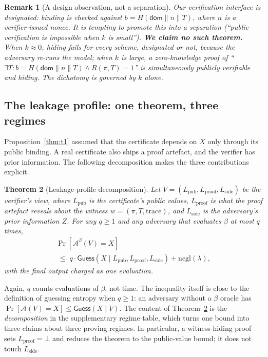 \documentclass[10pt,journal,compsoc]{IEEEtran}
\newtheorem{theorem}{Theorem}
\newtheorem{remark}[theorem]{Remark}
\begin{document}
\begin{remark}[A design observation, not a separation]
\label{rem:designated}
Our verification interface is \emph{designated}: binding is checked against
$b=H(\mathsf{dom}\|n\|T)$, where $n$ is a verifier-issued nonce. It is tempting
to promote this into a separation (``public verification is impossible when $k$
is small''). \textbf{We claim no such theorem.} When $k\approx 0$, hiding fails
for \emph{every} scheme, designated or not, because the adversary re-runs the
model; when $k$ is large, a zero-knowledge proof of
``$\exists T: b=H(\mathsf{dom}\|n\|T)\wedge R(\pi,T)=1$'' is simultaneously
publicly verifiable and hiding. The dichotomy is governed by $k$ alone.
\end{remark}

\subsection{The leakage profile: one theorem, three regimes}
\label{sec:leak}

Proposition~\ref{thm:t1} assumed that the certificate depends on $X$ only
through its public binding. A real certificate also ships a proof artefact, and
the verifier has prior information. The following decomposition makes the three
contributions explicit.

\begin{theorem}[Leakage-profile decomposition]
\label{thm:leak}
Let $V=(L_{\mathrm{pub}},L_{\mathrm{proof}},L_{\mathrm{side}})$ be the verifier's
view, where $L_{\mathrm{pub}}$ is the certificate's public values,
$L_{\mathrm{proof}}$ is what the proof artefact reveals about the witness
$w=(\pi,T,\mathrm{trace})$, and $L_{\mathrm{side}}$ is the adversary's prior
information $Z$. For any $q\ge 1$ and any adversary that evaluates $\beta$ at
most $q$ times,
\begin{multline*}
\Pr\!\left[\mathcal{A}^\beta(V)=X\right]\\
\;\le\; q\cdot\mathsf{Guess}\!\left(X\mid L_{\mathrm{pub}},L_{\mathrm{proof}},L_{\mathrm{side}}\right)
+\mathrm{negl}(\lambda),
\end{multline*}
with the final output charged as one evaluation.
\end{theorem}

Again, $q$ counts evaluations of $\beta$, not time. The inequality itself is
close to the definition of guessing entropy when $q\ge1$: an adversary without
a $\beta$ oracle has $\Pr[\mathcal{A}(V)=X]\le\mathsf{Guess}(X\mid V)$. The content of Theorem~\ref{thm:leak} is the
\emph{decomposition} in the supplementary regime table, which turns one bound into
three claims about three proving regimes. In particular, a witness-hiding proof
sets $L_{\mathrm{proof}}=\bot$ and reduces the theorem to the public-value bound;
it does not touch $L_{\mathrm{side}}$.
\end{document}
